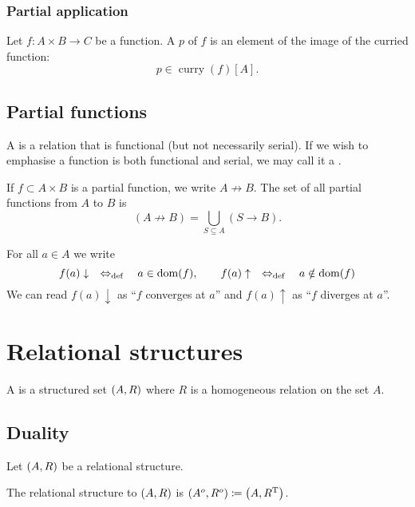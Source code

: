 \subsubsection{Partial application}
\begin{definition}
Let $f: A\times B \to C$ be a function. A  $p$ of $f$ is an element of the image of the curried function:
\[ p\in \operatorname{curry}(f)[A]. \]
\end{definition}

\subsection{Partial functions}
\begin{definition}
A  is a relation that is functional (but not necessarily serial). If we wish to emphasise a function is both functional and serial, we may call it a .
\end{definition}
If $f\subset A\times B$ is a partial function, we write $A\not \to B$. The set of all partial functions from $A$ to $B$ is
\[ (A\not \to B) = \bigcup _{S\subseteq A}(S\to B). \]

For all $a\in A$ we write
\[ f(a)\downarrow \quad\Leftrightarrow_{\text{def}}\quad a\in\operatorname{dom}(f),\qquad f(a)\uparrow \quad\Leftrightarrow_{\text{def}}\quad a\notin\operatorname{dom}(f) \]
We can read $f(a)\downarrow$ as ``$f$ converges at $a$'' and $f(a)\uparrow$ as ``$f$ diverges at $a$''.


\section{Relational structures}
\begin{definition}
A  is a structured set $\left( A, R \right)$ where $R$ is a homogeneous relation on the set $A$.
\end{definition}


\subsection{Duality}
\begin{definition}
Let $\left( A,R \right)$ be a relational structure.

The relational structure  to $\left( A,R \right)$ is $\left( A^o,R^o \right)\coloneqq \left( A,R^{\mathrm{T}} \right)$.
\end{definition}



